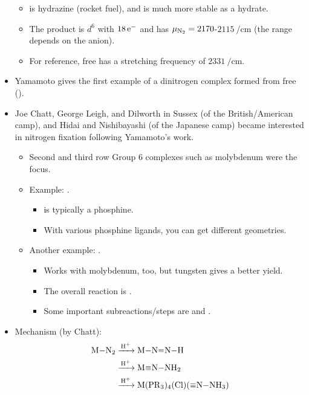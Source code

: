 \documentclass[../notes.tex]{subfiles}
\begin{document}
\begin{itemize}
\begin{itemize}
        \item {} is hydrazine (rocket fuel), and is much more stable as a hydrate.
        \item The product is $d^6$ with $18\,\e[-]$ and has $\mu_{\ce{N2}}=2170$-$\SI{2115}{\per\centi\meter}$ (the range depends on the anion).
        \item For reference, free  has a stretching frequency of $\SI{2331}{\per\centi\meter}$.
    \end{itemize}
    \item Yamamoto gives the first example of a dinitrogen complex formed from free  ().
    \item Joe Chatt, George Leigh, and Dilworth in Sussex (of the British/American camp), and Hidai and Nishibayashi (of the Japanese camp) became interested in nitrogen fixation following Yamamoto's work.
    \begin{itemize}
        \item Second and third row Group 6 complexes such as molybdenum were the focus.
        \item Example: .
        \begin{itemize}
            \item {} is typically a phosphine.
            \item With various phosphine ligands, you can get different geometries.
        \end{itemize}
        \item Another example: .
        \begin{itemize}
            \item Works with molybdenum, too, but tungsten gives a better yield.
            \item The overall reaction is .
            \item Some important subreactions/steps are  and .
        \end{itemize}
    \end{itemize}
    \item Mechanism (by Chatt):
    \begin{align*}
        \ce{M-N2} &\ce{->[H+]} \ce{M-N=N-H}\\
        &\ce{->[H+]} \ce{M#N-NH2}\\
        &\ce{->[H+]} \ce{M(PR3)4(Cl)(#N-NH3)}\\

\end{align*}
\end{itemize}
\end{document}
